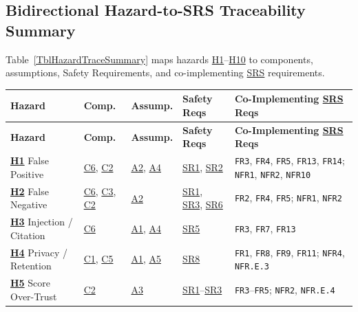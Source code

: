 \documentclass[11pt]{article}
\newcommand{\SRS}{\hyperlink{ha-acr-srs}{SRS}}
\begin{document}
\subsection{Bidirectional Hazard-to-SRS Traceability Summary}

Table~\ref{TblHazardTraceSummary} maps hazards \hyperref[haz:H1]{H1}--\hyperref[haz:H10]{H10} to components, assumptions, Safety Requirements, and co-implementing \SRS{} requirements.

{\small
\setlength{\tabcolsep}{4pt}
\begin{tabularx}{\textwidth}{P{2.6cm} P{1.7cm} P{1.5cm} P{2.2cm} Y}
\caption{Traceability Matrix Linking Hazards to Components, Assumptions, and SRS Requirements} \label{TblHazardTraceSummary}\\
\toprule
\textbf{Hazard} & \textbf{Comp.} & \textbf{Assump.} & \textbf{Safety Reqs} & \textbf{Co-Implementing \SRS{} Reqs}\\
\midrule
\endfirsthead
\toprule
\textbf{Hazard} & \textbf{Comp.} & \textbf{Assump.} & \textbf{Safety Reqs} & \textbf{Co-Implementing \SRS{} Reqs}\\
\midrule
\endhead
\bottomrule
\endfoot
\hyperref[haz:H1]{\textbf{H1}} False Positive & \hyperref[comp:C6]{C6}, \hyperref[comp:C2]{C2} & \hyperref[assump:A2]{A2}, \hyperref[assump:A4]{A4} & \hyperref[SR1]{SR1}, \hyperref[SR2]{SR2} & \texttt{FR3}, \texttt{FR4}, \texttt{FR5}, \texttt{FR13}, \texttt{FR14}; \texttt{NFR1}, \texttt{NFR2}, \texttt{NFR10}\\
\hyperref[haz:H2]{\textbf{H2}} False Negative & \hyperref[comp:C6]{C6}, \hyperref[comp:C3]{C3}, \hyperref[comp:C2]{C2} & \hyperref[assump:A2]{A2} & \hyperref[SR1]{SR1}, \hyperref[SR3]{SR3}, \hyperref[SR6]{SR6} & \texttt{FR2}, \texttt{FR4}, \texttt{FR5}; \texttt{NFR1}, \texttt{NFR2}\\
\hyperref[haz:H3]{\textbf{H3}} Injection / Citation & \hyperref[comp:C6]{C6} & \hyperref[assump:A1]{A1}, \hyperref[assump:A4]{A4} & \hyperref[SR5]{SR5} & \texttt{FR3}, \texttt{FR7}, \texttt{FR13}\\
\hyperref[haz:H4]{\textbf{H4}} Privacy / Retention & \hyperref[comp:C1]{C1}, \hyperref[comp:C5]{C5} & \hyperref[assump:A1]{A1}, \hyperref[assump:A5]{A5} & \hyperref[SR8]{SR8} & \texttt{FR1}, \texttt{FR8}, \texttt{FR9}, \texttt{FR11}; \texttt{NFR4}, \texttt{NFR.E.3}\\
\hyperref[haz:H5]{\textbf{H5}} Score Over-Trust & \hyperref[comp:C2]{C2} & \hyperref[assump:A3]{A3} & \hyperref[SR1]{SR1}--\hyperref[SR3]{SR3} & \texttt{FR3}--\texttt{FR5}; \texttt{NFR2}, \texttt{NFR.E.4}\\

\end{tabularx}}
\end{document}
